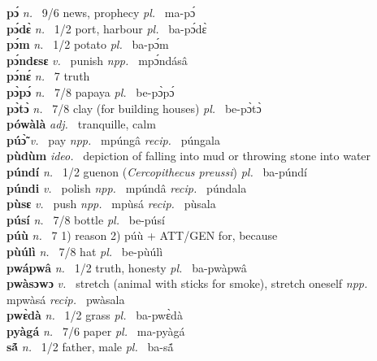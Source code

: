 {\bfseries pɔ́}  {\itshape n.~} 9/6 news, prophecy {\itshape pl.~} ma-pɔ́    \\ 
{\bfseries pɔ́dɛ̀}  {\itshape n.~} 1/2 port, harbour {\itshape pl.~} ba-pɔ́dɛ̀    \\ 
{\bfseries pɔ́m}  {\itshape n.~} 1/2 potato {\itshape pl.~} ba-pɔ́m    \\ 
{\bfseries pɔ́ndɛsɛ}  {\itshape v.~} punish   {\itshape npp.~} mpɔ́ndásâ  \\ 
{\bfseries pɔ́nɛ́}  {\itshape n.~} 7 truth    \\ 
{\bfseries pɔ̀pɔ́}  {\itshape n.~} 7/8 papaya {\itshape pl.~} be-pɔ̀pɔ́    \\ 
{\bfseries pɔ̀tɔ̀}  {\itshape n.~} 7/8 clay (for building houses) {\itshape pl.~} be-pɔ̀tɔ̀    \\ 
{\bfseries pówàlà}  {\itshape adj.~} tranquille, calm    \\ 
{\bfseries púɔ̃̀}  {\itshape v.~} pay   {\itshape npp.~} mpúngâ {\itshape recip.~} púngala \\ 
{\bfseries pùdùm}  {\itshape ideo.~} depiction of falling into mud or throwing stone into water    \\ 
{\bfseries púndí}  {\itshape n.~} 1/2 guenon ({\itshape Cercopithecus preussi}) {\itshape pl.~} ba-púndí    \\ 
{\bfseries púndi}  {\itshape v.~} polish   {\itshape npp.~} mpúndâ {\itshape recip.~} púndala  \\ 
{\bfseries pùsɛ}  {\itshape v.~} push   {\itshape npp.~} mpùsá {\itshape recip.~} pùsala  \\ 
{\bfseries púsí}  {\itshape n.~} 7/8 bottle {\itshape pl.~} be-púsí    \\ 
{\bfseries púù}  {\itshape n.~} 7 1) reason 2) púù + ATT/GEN for, because    \\ 
{\bfseries pùúlì}  {\itshape n.~} 7/8 hat {\itshape pl.~} be-pùúlì    \\ 
{\bfseries pwápwâ}  {\itshape n.~} 1/2 truth, honesty {\itshape pl.~} ba-pwàpwâ    \\ 
{\bfseries pwàsɔwɔ}  {\itshape v.~} stretch (animal with sticks for smoke), stretch oneself   {\itshape npp.~} mpwàsá {\itshape recip.~} pwàsala  \\ 
{\bfseries pwɛ̀dà}  {\itshape n.~} 1/2 grass {\itshape pl.~} ba-pwɛ̀dà    \\ 
{\bfseries pyàgá}  {\itshape n.~} 7/6 paper {\itshape pl.~} ma-pyàgá    \\ 
{\bfseries sã́} {\itshape n.~} 1/2 father, male {\itshape pl.~} ba-sã́    \\


